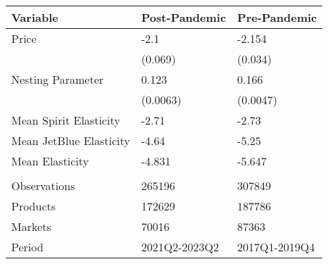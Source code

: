 
\begin{tabular}[t]{lll}
\toprule
Variable & Post-Pandemic & Pre-Pandemic\\
\midrule
Price & -2.1 & -2.154\\
 & (0.069) & (0.034)\\
Nesting Parameter & 0.123 & 0.166\\
 & (0.0063) & (0.0047)\\
\midrule
Mean Spirit Elasticity & -2.71 & -2.73\\
Mean JetBlue Elasticity & -4.64 & -5.25\\
Mean Elasticity & -4.831 & -5.647\\
\midrule\\
Observations & 265196 & 307849\\
Products & 172629 & 187786\\
Markets & 70016 & 87363\\
Period & 2021Q2-2023Q2 & 2017Q1-2019Q4\\
\bottomrule
\end{tabular}
